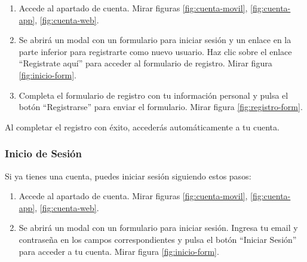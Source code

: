 \begin{enumerate}
	\item Accede al apartado de cuenta. Mirar figuras \ref{fig:cuenta-movil}, \ref{fig:cuenta-app}, \ref{fig:cuenta-web}.
	\item Se abrirá un modal con un formulario para iniciar sesión y un enlace en la parte inferior para registrarte como nuevo usuario.
	      Haz clic sobre el enlace “Registrate aquí” para acceder al formulario de registro. Mirar figura \ref{fig:inicio-form}.
	\item Completa el formulario de registro con tu información personal y pulsa el botón “Registrarse” para enviar el formulario. Mirar figura \ref{fig:registro-form}.
\end{enumerate}

Al completar el registro con éxito, accederás automáticamente a tu cuenta.


\subsubsection{Inicio de Sesión}
Si ya tienes una cuenta, puedes iniciar sesión siguiendo estos pasos:

\begin{enumerate}
	\item Accede al apartado de cuenta. Mirar figuras \ref{fig:cuenta-movil}, \ref{fig:cuenta-app}, \ref{fig:cuenta-web}.
	\item Se abrirá un modal con un formulario para iniciar sesión.
	      Ingresa tu email y contraseña en los campos correspondientes y pulsa el botón “Iniciar Sesión” para acceder a tu cuenta. Mirar figura \ref{fig:inicio-form}.
\end{enumerate}

